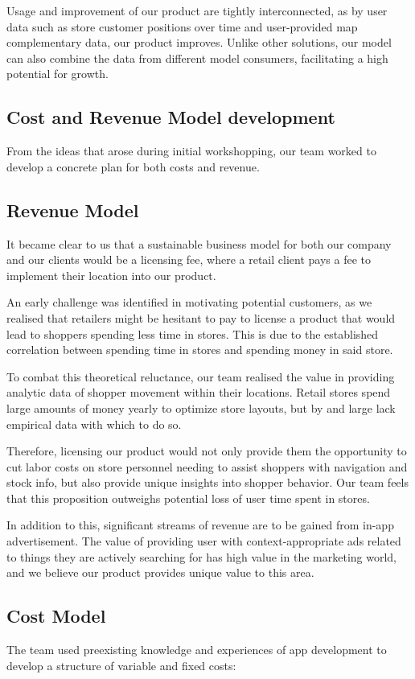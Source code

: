 \documentclass[titlepage]{article}
\begin{document}
Usage and improvement of our product are tightly interconnected, as by user data such as store customer positions over time 
and user-provided map complementary data, our product improves. 
Unlike other solutions, our model can also combine the data from different model consumers, 
facilitating a high potential for growth.
\subsection{Cost and Revenue Model development}
From the ideas that arose during initial workshopping, our team worked to develop a concrete plan for both costs and revenue.
\subsection{Revenue Model}
It became clear to us that a sustainable business model for both our company and our clients would be a licensing fee, where a retail client pays a fee to implement their location into our product. 

An early challenge was identified in motivating potential customers, as we realised that retailers might be hesitant to pay to license a product that would lead to shoppers spending less time in stores.
This is due to the established correlation between spending time in stores and spending money in said store.\cite{byron}  

To combat this theoretical reluctance, our team realised the value in providing analytic data of shopper movement within their locations. Retail stores spend large amounts of money yearly to optimize store layouts, but by and large lack empirical data with which to do so. 

Therefore, licensing our product would not only provide them the opportunity to cut labor costs on store personnel needing to assist shoppers with navigation and stock info, but also provide unique insights into shopper behavior. Our team feels that this proposition outweighs potential loss of user time spent in stores.

In addition to this, significant streams of revenue are to be gained from in-app advertisement. The value of providing user with context-appropriate ads related to things they are actively searching for has high value in the marketing world, and we believe our product provides unique value to this area.

\subsection{Cost Model}
The team used preexisting knowledge and experiences of app development to develop a structure of variable and fixed costs:
\end{document}

